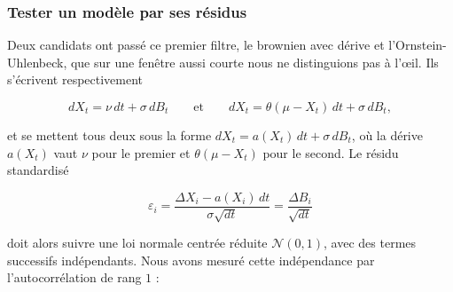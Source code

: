 \documentclass[11pt,a4paper]{article}
\begin{document}
\begin{table}[ht]
  \centering
  \caption{Modèles vus en cours et leur pertinence pour $(X_t)$. Seuls les rejets sont justifiés.}
  \label{tab:modeles}
\end{table}

\subsubsection*{Tester un modèle par ses résidus}

Deux candidats ont passé ce premier filtre, le brownien avec dérive et l'Ornstein-Uhlenbeck, que sur une fenêtre aussi courte nous ne distinguions pas à l'œil. Ils s'écrivent respectivement

\begin{equation}\label{eq:modeles}
  dX_t = \nu\,dt + \sigma\,dB_t \qquad \text{et} \qquad dX_t = \theta(\mu - X_t)\,dt + \sigma\,dB_t,
\end{equation}

et se mettent tous deux sous la forme $dX_t = a(X_t)\,dt + \sigma\,dB_t$, où la dérive $a(X_t)$ vaut $\nu$ pour le premier et $\theta(\mu - X_t)$ pour le second. Le résidu standardisé

\begin{equation}\label{eq:residu}
  \varepsilon_i = \frac{\Delta X_i - a(X_i)\,dt}{\sigma\sqrt{dt}} = \frac{\Delta B_i}{\sqrt{dt}}
\end{equation}

doit alors suivre une loi normale centrée réduite $\mathcal N(0,1)$, avec des termes successifs indépendants. Nous avons mesuré cette indépendance par l'autocorrélation de rang $1$ :
\end{document}
